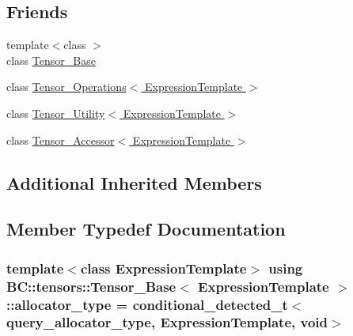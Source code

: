 \subsection*{Friends}
\begin{DoxyCompactItemize}
\item 
{\footnotesize template$<$class $>$ }\\class \hyperlink{classBC_1_1tensors_1_1Tensor__Base_a794d203bce037da65d945527a3fe4837}{Tensor\+\_\+\+Base}
\item 
class \hyperlink{classBC_1_1tensors_1_1Tensor__Base_a8bbd7150ed9c36db5b932c0a73096677}{Tensor\+\_\+\+Operations$<$ Expression\+Template $>$}
\item 
class \hyperlink{classBC_1_1tensors_1_1Tensor__Base_aaa8ea88f77d460ba935be4e28eac3b41}{Tensor\+\_\+\+Utility$<$ Expression\+Template $>$}
\item 
class \hyperlink{classBC_1_1tensors_1_1Tensor__Base_ace8a25fd8f9b368faf432ce1aa395f28}{Tensor\+\_\+\+Accessor$<$ Expression\+Template $>$}
\end{DoxyCompactItemize}
\subsection*{Additional Inherited Members}


\subsection{Member Typedef Documentation}
\subsubsection[{\texorpdfstring{allocator\+\_\+type}{allocator_type}}]{\setlength{\rightskip}{0pt plus 5cm}template$<$class Expression\+Template$>$ using {\bf B\+C\+::tensors\+::\+Tensor\+\_\+\+Base}$<$ Expression\+Template $>$\+::{\bf allocator\+\_\+type} =  {\bf conditional\+\_\+detected\+\_\+t}$<${\bf query\+\_\+allocator\+\_\+type}, Expression\+Template, void$>$}\hypertarget{classBC_1_1tensors_1_1Tensor__Base_a35ddc7a09653b3c775eee73f04247651}{}\label{classBC_1_1tensors_1_1Tensor__Base_a35ddc7a09653b3c775eee73f04247651}
